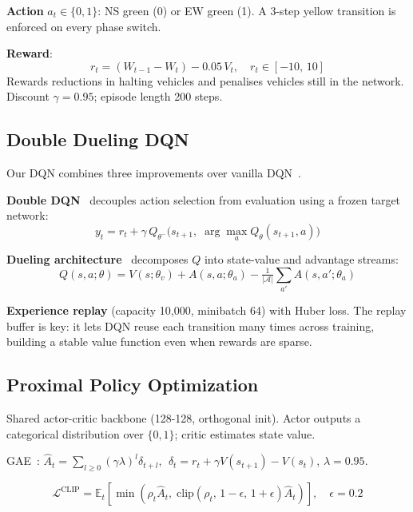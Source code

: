 \documentclass[10pt]{article}
\begin{document}
\textbf{Action} $a_t \in \{0, 1\}$: NS green (0) or EW green (1).
A 3-step yellow transition is enforced on every phase switch.

\textbf{Reward}:
\begin{equation}
r_t = (W_{t-1} - W_t) - 0.05\,V_t, \quad r_t \in [-10,\,10]
\label{eq:reward}
\end{equation}
Rewards reductions in halting vehicles and penalises vehicles still in the
network.  Discount $\gamma = 0.95$; episode length 200 steps.

\subsection{Double Dueling DQN}

Our DQN combines three improvements over vanilla DQN~\citep{mnih2015human}.

\textbf{Double DQN}~\citep{van2016deep} decouples action selection from
evaluation using a frozen target network:
\begin{equation}
y_t = r_t + \gamma\,Q_{\theta^-}\!\bigl(s_{t+1},\;
      \arg\max_a Q_\theta(s_{t+1}, a)\bigr)
\end{equation}

\textbf{Dueling architecture}~\citep{wang2016dueling} decomposes $Q$ into
state-value and advantage streams:
\begin{equation}
Q(s,a;\theta) = V(s;\theta_v) +
A(s,a;\theta_a) - \tfrac{1}{|\mathcal{A}|}\textstyle\sum_{a'}A(s,a';\theta_a)
\end{equation}

\textbf{Experience replay} (capacity 10,000, minibatch 64) with Huber loss.
The replay buffer is key: it lets DQN reuse each transition many times across
training, building a stable value function even when rewards are sparse.

\subsection{Proximal Policy Optimization}

Shared actor-critic backbone (128-128, orthogonal init).  Actor outputs a
categorical distribution over $\{0,1\}$; critic estimates state value.

GAE~\citep{schulman2015high}: $\hat{A}_t = \sum_{l \ge 0}(\gamma\lambda)^l
\delta_{t+l}$, $\;\delta_t = r_t + \gamma V(s_{t+1}) - V(s_t)$, $\lambda{=}0.95$.

\begin{equation}
\mathcal{L}^{\text{CLIP}} =
\mathbb{E}_t\!\left[\min\!\left(
  \rho_t\hat{A}_t,\;
  \text{clip}(\rho_t,\,1{-}\epsilon,\,1{+}\epsilon)\hat{A}_t
\right)\right], \quad \epsilon=0.2
\end{equation}
\end{document}
